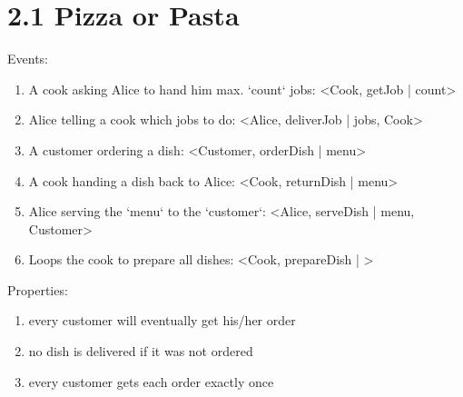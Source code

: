 \documentclass{article}
\begin{document}
	\pagestyle{fancy}
	
    \section*{2.1 Pizza or Pasta}
    
        Events:
        \begin{enumerate}
            \item A cook asking Alice to hand him max. `count` jobs: <Cook, getJob | count>
            \item Alice telling a cook which jobs to do: <Alice, deliverJob | jobs, Cook>
            \item A customer ordering a dish: <Customer, orderDish | menu>
            \item A cook handing a dish back to Alice: <Cook, returnDish | menu>
            \item Alice serving the `menu` to the `customer`: <Alice, serveDish | menu, Customer>
            \item Loops the cook to prepare all dishes: <Cook, prepareDish | >
        \end{enumerate}
        Properties:
        \begin{enumerate}
            \item every customer will eventually get his/her order
            \item no dish is delivered if it was not ordered  
            \item every customer gets each order exactly once
        \end{enumerate}
\end{document}
